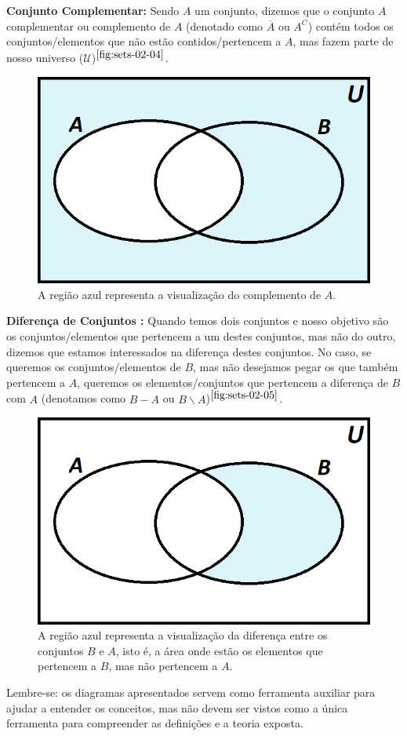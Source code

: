   \textbf{Conjunto Complementar:} Sendo $A$ um conjunto, dizemos que o conjunto $A$ complementar ou complemento de $A$ (denotado como $\overline A$ ou $A^C$) contém todos os conjuntos/elementos que não estão contidos/pertencem a $A$, mas fazem parte de nosso universo ($\mathcal U$)$^{\ref{fig:sets-02-04}}$.

  \begin{figure}[hbt!]
      \centering
      \includegraphics[width = 7 cm]{figures/sets/fig-sets-02-04.png}
      \caption{A região azul representa a visualização do complemento de $A$.}
      \label{fig:sets-02-04}
  \end{figure}

  \textbf{Diferença de Conjuntos :} Quando temos dois conjuntos e nosso objetivo são os conjuntos/elementos que pertencem a um destes conjuntos, mas não do outro, dizemos que estamos interessados na diferença destes conjuntos. No caso, se queremos os conjuntos/elementos de $B$, mas não desejamos pegar os que também pertencem a $A$, queremos os elementos/conjuntos que pertencem a diferença de $B$ com $A$ (denotamos como $B-A$ ou $B \backslash A$)$^{\ref{fig:sets-02-05}}$.

  \begin{figure}[hbt!]
      \centering
      \includegraphics[width = 7 cm]{figures/sets/fig-sets-02-05.png}
      \caption{A região azul representa a visualização da diferença entre os conjuntos $B$ e $A$, isto é, a área onde estão os elementos que pertencem a $B$, mas não pertencem a $A$.}
      \label{fig:sets-02-05}
  \end{figure}

  Lembre-se: os diagramas apresentados servem como ferramenta auxiliar para ajudar a entender os conceitos, mas não devem ser vistos como a única ferramenta para compreender as definições e  a teoria exposta.

